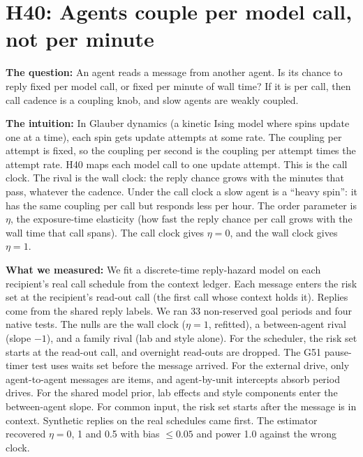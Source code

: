 \section{H40: Agents couple per model call, not per minute}

\textbf{The question:} An agent reads a message from another agent. Is its chance to reply fixed per model call, or fixed per minute of wall time? If it is per call, then call cadence is a coupling knob, and slow agents are weakly coupled.

\textbf{The intuition:} In Glauber dynamics (a kinetic Ising model where spins update one at a time), each spin gets update attempts at some rate. The coupling per attempt is fixed, so the coupling per second is the coupling per attempt times the attempt rate. H40 maps each model call to one update attempt. This is the call clock. The rival is the wall clock: the reply chance grows with the minutes that pass, whatever the cadence. Under the call clock a slow agent is a ``heavy spin'': it has the same coupling per call but responds less per hour. The order parameter is $\eta$, the exposure-time elasticity (how fast the reply chance per call grows with the wall time that call spans). The call clock gives $\eta=0$, and the wall clock gives $\eta=1$.

\textbf{What we measured:} We fit a discrete-time reply-hazard model on each recipient's real call schedule from the context ledger. Each message enters the risk set at the recipient's read-out call (the first call whose context holds it). Replies come from the shared reply labels. We ran 33 non-reserved goal periods and four native tests. The nulls are the wall clock ($\eta=1$, refitted), a between-agent rival (slope $-1$), and a family rival (lab and style alone). For the scheduler, the risk set starts at the read-out call, and overnight read-outs are dropped. The G51 pause-timer test uses waits set before the message arrived. For the external drive, only agent-to-agent messages are items, and agent-by-unit intercepts absorb period drives. For the shared model prior, lab effects and style components enter the between-agent slope. For common input, the risk set starts after the message is in context. Synthetic replies on the real schedules came first. The estimator recovered $\eta=0$, 1 and 0.5 with bias $\le0.05$ and power 1.0 against the wrong clock.

